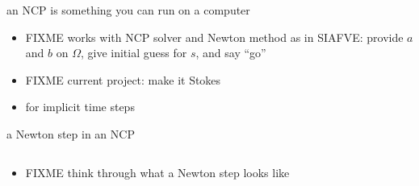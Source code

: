 \documentclass[10pt,hyperref,dvipsnames]{beamer}
\begin{document}
\begin{frame}{an NCP is something you can run on a computer}
\begin{itemize}
\item FIXME works with NCP solver and Newton method as in SIAFVE: provide $a$ and $b$ on $\Omega$, give initial guess for $s$, and say ``go''
\item FIXME current project: make it Stokes
\item for implicit time steps
\end{itemize}
\end{frame}


\begin{frame}{a Newton step in an NCP}

\begin{columns}
\begin{column}{0.7\textwidth}
\begin{itemize}
\item FIXME think through what a Newton step looks like
\end{itemize}
\end{column}
\begin{column}{0.3\textwidth}

\end{column}
\end{columns}
\end{frame}
\end{document}
